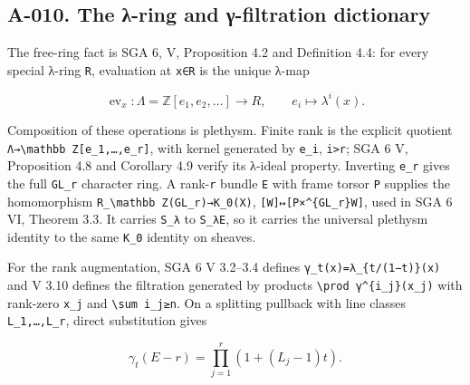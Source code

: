 \documentclass[
  10pt,
]{article}
\begin{document}
\subsection{A-010. The λ-ring and γ-filtration
dictionary}\label{a-010.-the-ux3bb-ring-and-ux3b3-filtration-dictionary}

The free-ring fact is SGA 6, V, Proposition 4.2 and Definition 4.4: for
every special λ-ring \texttt{\small R}, evaluation at
\texttt{\small x∈R} is the unique λ-map

\[
\operatorname{ev}_x:\Lambda=\mathbb Z[e_1,e_2,…]\longrightarrow R,
\qquad e_i\longmapsto\lambda^i(x).
\]

Composition of these operations is plethysm. Finite rank is the explicit
quotient
\texttt{\small Λ→\allowbreak{}\textbackslash{}mathbb Z[\allowbreak{}e\_\allowbreak{}1,\allowbreak{}…,\allowbreak{}e\_\allowbreak{}r]\allowbreak{}},
with kernel generated by \texttt{\small e\_\allowbreak{}i},
\texttt{\small i>r}; SGA 6 V, Proposition 4.8 and Corollary 4.9 verify
its λ-ideal property. Inverting \texttt{\small e\_\allowbreak{}r} gives
the full \texttt{\small GL\_\allowbreak{}r} character ring. A
rank-\texttt{\small r} bundle \texttt{\small E} with frame torsor
\texttt{\small P} supplies the homomorphism
\texttt{\small R\_\allowbreak{}\textbackslash{}mathbb Z(\allowbreak{}GL\_\allowbreak{}r)\allowbreak{}→\allowbreak{}K\_\allowbreak{}0(\allowbreak{}X)\allowbreak{}},
\texttt{\small [\allowbreak{}W]\allowbreak{}↦[\allowbreak{}P×\textasciicircum{}\{GL\_\allowbreak{}r\}W]\allowbreak{}},
used in SGA 6 VI, Theorem 3.3. It carries
\texttt{\small S\_\allowbreak{}λ} to \texttt{\small S\_\allowbreak{}λE},
so it carries the universal plethysm identity to the same
\texttt{\small K\_\allowbreak{}0} identity on sheaves.

For the rank augmentation, SGA 6 V 3.2--3.4 defines
\texttt{\small γ\_\allowbreak{}t(\allowbreak{}x)\allowbreak{}=\allowbreak{}λ\_\allowbreak{}\{t/\allowbreak{}(\allowbreak{}1−t)\allowbreak{}\}(\allowbreak{}x)\allowbreak{}}
and V 3.10 defines the filtration generated by products
\texttt{\small \textbackslash{}prod γ\textasciicircum{}\{i\_\allowbreak{}j\}(\allowbreak{}x\_\allowbreak{}j)\allowbreak{}}
with rank-zero \texttt{\small x\_\allowbreak{}j} and
\texttt{\small \textbackslash{}sum i\_\allowbreak{}j≥\allowbreak{}n}. On
a splitting pullback with line classes
\texttt{\small L\_\allowbreak{}1,\allowbreak{}…,\allowbreak{}L\_\allowbreak{}r},
direct substitution gives

\[
\gamma_t(E-r)=\prod_{j=1}^r(1+(L_j-1)t).
\]
\end{document}
